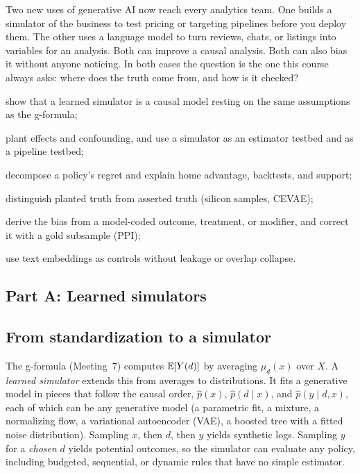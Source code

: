 \documentclass[11pt]{article}
\begin{document}

\begin{decision}
Two new uses of generative AI now reach every analytics team. One builds a simulator of the business to test pricing or
targeting pipelines before you deploy them. The other uses a language model to turn reviews, chats, or listings into variables
for an analysis. Both can improve a causal analysis. Both can also bias it without anyone noticing. In both cases the question is the one this course
always asks: where does the truth come from, and how is it checked?
\end{decision}

\begin{goals}
  \item show that a learned simulator is a causal model resting on the same assumptions as the g-formula;
  \item plant effects and confounding, and use a simulator as an estimator testbed and as a pipeline testbed;
  \item decompose a policy's regret and explain home advantage, backtests, and support;
  \item distinguish planted truth from asserted truth (silicon samples, CEVAE);
  \item derive the bias from a model-coded outcome, treatment, or modifier, and correct it with a gold subsample (PPI);
  \item use text embeddings as controls without leakage or overlap collapse.
\end{goals}

\sectionone

\subsection*{Part A: Learned simulators}

\subsection{From standardization to a simulator}

The g-formula (Meeting~7) computes $\mathbb{E}[Y(d)]$ by averaging $\mu_d(x)$ over $X$. A \emph{learned simulator} extends this from averages
to distributions. It fits a generative model in pieces that follow the causal order, $\hat p(x)$, $\hat p(d \mid x)$, and
$\hat p(y \mid d, x)$, each of which can be any generative model (a parametric fit, a mixture, a normalizing flow, a variational
autoencoder (VAE), a boosted tree with a fitted noise distribution). Sampling $x$, then $d$, then $y$ yields synthetic logs. Sampling $y$ for a
\emph{chosen} $d$ yields potential outcomes, so the simulator can evaluate any policy, including budgeted, sequential, or dynamic
rules that have no simple estimator.
\end{document}
